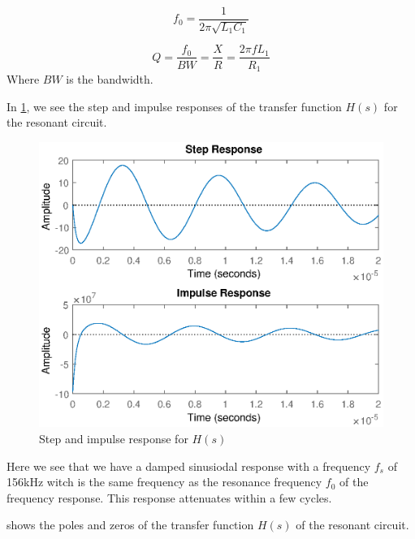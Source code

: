 \begin{equation} \label{eq:f0}
    f_0 = \frac{1}{2 \pi \sqrt{L_1 C_1}}
\end{equation}

\begin{equation} \label{eq:Q}
    Q = \frac{f_0}{BW} = \frac{X}{R} = \frac{2 \pi f L_1}{R_1}
\end{equation}
Where $BW$ is the bandwidth.

In \cref{fig:step}, we see the step and impulse responses of the transfer function $H(s)$ for the resonant circuit.

\begin{figure}[H]
    \centering
    \includegraphics[width=\textwidth]{img/CoilRigResponse.eps}
    \caption{Step and impulse response for $H(s)$}
    \label{fig:step}
\end{figure}

Here we see that we have a damped sinusiodal response with a frequency $f_s$ of 156kHz witch is the same frequency as the resonance frequency $f_0$ of the frequency response. This response attenuates within a few cycles.

 shows the poles and zeros of the transfer function $H(s)$ of the resonant circuit.

